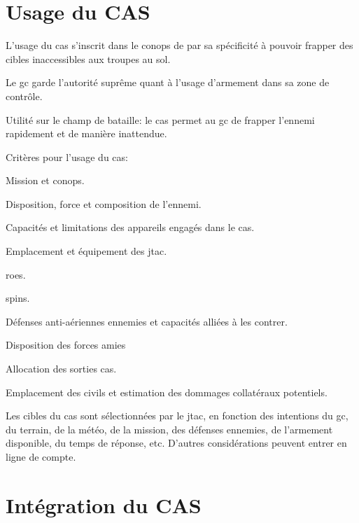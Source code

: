 \section{Usage du CAS}

\begin{e1}
	\item
	L'usage du \gls{cas} s'inscrit dans le \gls{conops} de par sa spécificité à pouvoir frapper des cibles inaccessibles aux troupes au sol.
	
	\item
	Le \gls{gc} garde l'autorité suprême quant à l'usage d'armement dans sa zone de contrôle.
	
	\item
	Utilité sur le champ de bataille: le \gls{cas} permet au \gls{gc} de frapper l'ennemi rapidement et de manière inattendue.
	
	\item Critères pour l'usage du \gls{cas}:
	
	\begin{e2}
		\item Mission et \gls{conops}.
		\item Disposition, force et composition de l'ennemi.
		\item Capacités et limitations des appareils engagés dans le \gls{cas}.
		\item Emplacement et équipement des \gls{jtac}.
		\item \glspl{roe}.
		\item \gls{spins}.
		\item Défenses anti-aériennes ennemies et capacités alliées à les contrer.
		\item Disposition des forces amies
		\item Allocation des sorties \gls{cas}.
		\item Emplacement des civils et estimation des dommages collatéraux potentiels.	
	\end{e2}
	
	\item Les cibles du \gls{cas} sont sélectionnées par le \gls{jtac}, en fonction des intentions du \gls{gc}, du terrain, de la météo, de la mission, des défenses ennemies, de l'armement disponible, du temps de réponse, etc. D'autres considérations peuvent entrer en ligne de compte.
\end{e1}
	
\section{Intégration du CAS}

